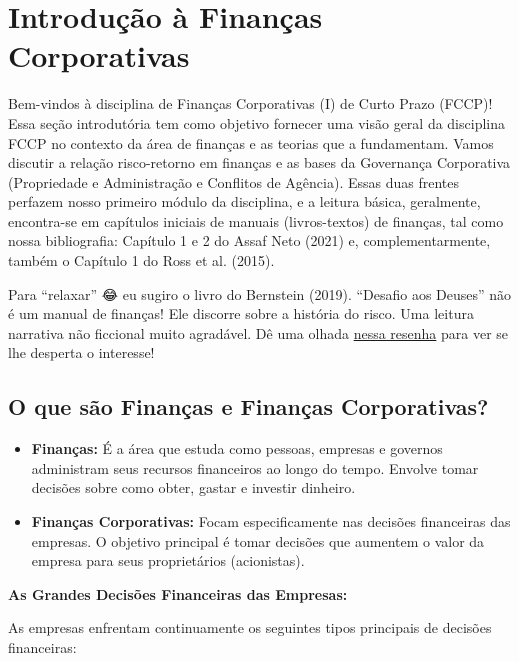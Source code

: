 \documentclass[
  a4paper,
]{book}
\begin{document}

\chapter{Introdução à Finanças Corporativas}\label{sec-intro}

Bem-vindos à disciplina de Finanças Corporativas (I) de Curto Prazo
(FCCP)! Essa seção introdutória tem como objetivo fornecer uma visão
geral da disciplina FCCP no contexto da área de finanças e as teorias
que a fundamentam. Vamos discutir a relação risco-retorno em finanças e
as bases da Governança Corporativa (Propriedade e Administração e
Conflitos de Agência). Essas duas frentes perfazem nosso primeiro módulo
da disciplina, e a leitura básica, geralmente, encontra-se em capítulos
iniciais de manuais (livros-textos) de finanças, tal como nossa
bibliografia: Capítulo 1 e 2 do Assaf Neto (2021) e, complementarmente,
também o Capítulo 1 do Ross et al. (2015).

Para ``relaxar'' 😂 eu sugiro o livro do Bernstein (2019). ``Desafio aos
Deuses'' não é um manual de finanças! Ele discorre sobre a história do
risco. Uma leitura narrativa não ficcional muito agradável. Dê uma
olhada
\href{https://medium.com/@fabiofigueiredo_44303/resenha-do-livro-desafio-aos-deuses-a-hist\%C3\%B3ria-do-risco-9607fab2aa30}{nessa
resenha} para ver se lhe desperta o interesse!

\section{O que são Finanças e Finanças
Corporativas?}\label{o-que-suxe3o-finanuxe7as-e-finanuxe7as-corporativas}

\begin{itemize}
\item
  \textbf{Finanças:} É a área que estuda como pessoas, empresas e
  governos administram seus recursos financeiros ao longo do tempo.
  Envolve tomar decisões sobre como obter, gastar e investir dinheiro.
\item
  \textbf{Finanças Corporativas:} Focam especificamente nas decisões
  financeiras das empresas. O objetivo principal é tomar decisões que
  aumentem o valor da empresa para seus proprietários (acionistas).
\end{itemize}

\textbf{As Grandes Decisões Financeiras das Empresas:}

As empresas enfrentam continuamente os seguintes tipos principais de
decisões financeiras:
\end{document}
